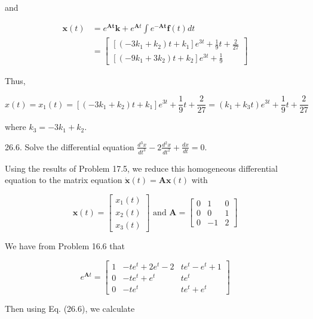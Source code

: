 \documentclass[10pt]{article}
\begin{document}
and

$$
\begin{aligned}
\mathbf{x}(t) & =e^{\mathbf{A} \mathbf{t}} \mathbf{k}+e^{\mathbf{A} t} \int e^{-\mathbf{A} \mathbf{t}} \mathbf{f}(t) d t \\
& =\left[\begin{array}{c}
{\left[\left(-3 k_{1}+k_{2}\right) t+k_{1}\right] e^{3 t}+\frac{1}{9} t+\frac{2}{27}} \\
{\left[\left(-9 k_{1}+3 k_{2}\right) t+k_{2}\right] e^{3 t}+\frac{1}{9}}
\end{array}\right]
\end{aligned}
$$

Thus,

$$
x(t)=x_{1}(t)=\left[\left(-3 k_{1}+k_{2}\right) t+k_{1}\right] e^{3 t}+\frac{1}{9} t+\frac{2}{27}=\left(k_{1}+k_{3} t\right) e^{3 t}+\frac{1}{9} t+\frac{2}{27}
$$

where $k_{3}=-3 k_{1}+k_{2}$.

26.6. Solve the differential equation $\frac{d^{3} x}{d t^{3}}-2 \frac{d^{2} x}{d t^{2}}+\frac{d x}{d t}=0$.

Using the results of Problem 17.5, we reduce this homogeneous differential equation to the matrix equation $\dot{\mathbf{x}}(t)=\mathbf{A x}(t)$ with

$$
\mathbf{x}(t)=\left[\begin{array}{l}
x_{1}(t) \\
x_{2}(t) \\
x_{3}(t)
\end{array}\right] \text { and } \mathbf{A}=\left[\begin{array}{rrr}
0 & 1 & 0 \\
0 & 0 & 1 \\
0 & -1 & 2
\end{array}\right]
$$

We have from Problem 16.6 that

$$
e^{\mathbf{A} t}=\left[\begin{array}{ccc}
1 & -t e^{t}+2 e^{t}-2 & t e^{t}-e^{t}+1 \\
0 & -t e^{t}+e^{t} & t e^{t} \\
0 & -t e^{t} & t e^{t}+e^{t}
\end{array}\right]
$$

Then using Eq. (26.6), we calculate
\end{document}
